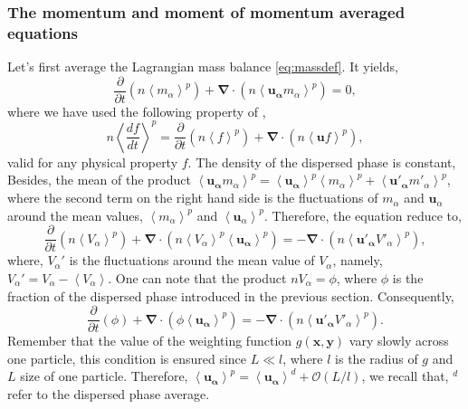 \subsubsection*{The momentum and moment of momentum averaged equations}
Let's first average the Lagrangian mass balance \ref{eq:massdef}.
It yields,   
\begin{equation}
    \frac{\partial }{\partial t}(n\left<m_\alpha\right>^p) 
    + \bm{\nabla}\cdot(n\left<\bm{u_\alpha}m_\alpha\right>^p)
    = 0,
\end{equation}  
where we have used the following property of \citep{anderson1967fluid},
\begin{equation*}
    n \left<\frac{d f}{dt}\right>^p 
    = \frac{\partial }{\partial t}(n\left<f\right>^p) 
    + \bm{\nabla}\cdot(n\left<\bm{u} f\right>^p),
\end{equation*}
valid for any physical property $f$.
The density of the dispersed phase is constant,
Besides, the mean of the product $\left<\bm{u_\alpha}m_\alpha\right>^p = \left<\bm{u_\alpha}\right>^p\left<m_\alpha\right>^p+\left<\bm{u'_\alpha}m'_\alpha\right>^p$, where the second term on the right hand side is the fluctuations of $m_\alpha$ and $\bm{u}_\alpha$ around the mean values, $\left<m_\alpha\right>^p$ and $\left<\bm{u}_\alpha\right>^p$. 
Therefore, the equation reduce to,
\begin{equation}
    \frac{\partial }{\partial t}(n\left<V_\alpha\right>^p) 
    + \bm{\nabla}\cdot(n\left<V_\alpha\right>^p\left<\bm{u_\alpha}\right>^p )
    = 
    - \bm{\nabla}\cdot(n\left<\bm{u'_\alpha}V'_\alpha\right>^p),
\end{equation}  
where, $V_\alpha'$ is the fluctuations around the mean value of $V_\alpha$,
namely, $V_\alpha' = V_\alpha - \left<V_\alpha\right>$.
One can note that the product $nV_\alpha = \phi$, where $\phi$ is the fraction of the dispersed phase introduced in the previous section. 
Consequently, 
\begin{equation}
    \frac{\partial }{\partial t}(\phi) 
    + \bm{\nabla}\cdot(\phi\left<\bm{u_\alpha}\right>^p )
    = 
    - \bm{\nabla}\cdot(n\left<\bm{u'_\alpha}V'_\alpha\right>^p).
    \label{eq:massavg}
\end{equation}  
Remember that the value of the weighting function $g(\bm{x},\bm{y})$ vary slowly across one particle, this condition is ensured since $L\ll l$, where $l$ is the radius of $g$ and $L$ size of one particle. 
Therefore, $\left<\bm{u_\alpha}\right>^p =\left<\bm{u_\alpha}\right>^d + \mathcal{O}\left(L/l\right)$, we recall that, $^d$ refer to the dispersed phase average.
